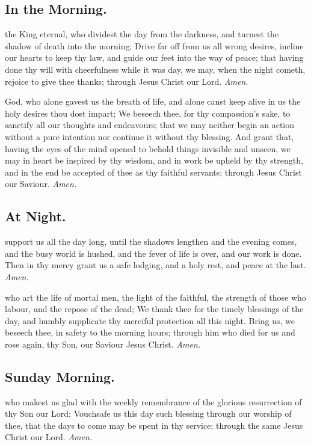 \subsection{In the Morning.}
 the King eternal, who dividest the day from the darkness, and turnest the shadow of death into the morning; Drive far off from us all wrong desires, incline our hearts to keep thy law, and guide our feet into the way of peace; that having done thy will with cheerfulness while it was day, we may, when the night cometh, rejoice to give thee thanks; through Jesus Christ our Lord. \textit{Amen.}

 God, who alone gavest us the breath of life, and alone canst keep alive in us the holy desires thou dost impart; We beseech thee, for thy compassion's sake, to sanctify all our thoughts and endeavours; that we may neither begin an action without a pure intention nor continue it without thy blessing. And grant that, having the eyes of the mind opened to behold things invisible and unseen, we may in heart be inspired by thy wisdom, and in work be upheld by thy strength, and in the end be accepted of thee as thy faithful servants; through Jesus Christ our Saviour. \textit{Amen.}

\subsection{At Night.}
 support us all the day long, until the shadows lengthen and the evening comes, and the busy world is hushed, and the fever of life is over, and our work is done. Then in thy mercy grant us a safe lodging, and a holy rest, and peace at the last. \textit{Amen.}

 who art the life of mortal men, the light of the faithful, the strength of those who labour, and the repose of the dead; We thank thee for the timely blessings of the day, and humbly supplicate thy merciful protection all this night. Bring us, we beseech thee, in safety to the morning hours; through him who died for us and rose again, thy Son, our Saviour Jesus Christ. \textit{Amen.}

\subsection{Sunday Morning.}
 who makest us glad with the weekly remembrance of the glorious resurrection of thy Son our Lord; Vouchsafe us this day such blessing through our worship of thee, that the days to come may be spent in thy service; through the same Jesus Christ our Lord. \textit{Amen.}


